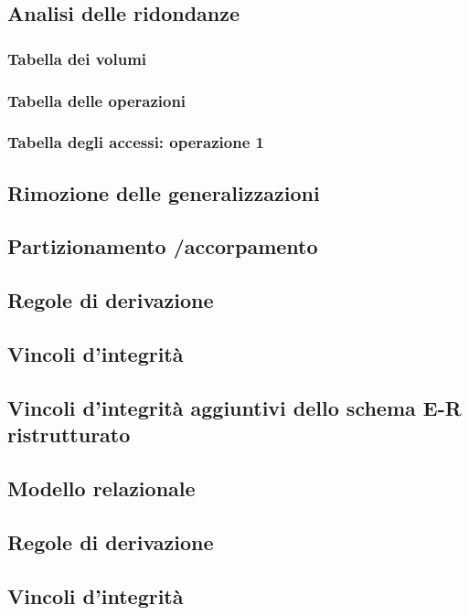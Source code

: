\documentclass[legalpaper]{article}
\begin{document}
\subsection{Analisi delle ridondanze}
\subsubsection{Tabella dei volumi}
\subsubsection{Tabella delle operazioni}
\subsubsection{Tabella degli accessi: operazione 1}

\subsection{Rimozione delle generalizzazioni}

\subsection{Partizionamento /accorpamento}

\subsection{Regole di derivazione}

\subsection{Vincoli d'integrità}

\subsection{Vincoli d'integrità aggiuntivi dello schema E-R ristrutturato}

\subsection{Modello relazionale}


\subsection{Regole di derivazione}

\subsection{Vincoli d'integrità}
\end{document}
